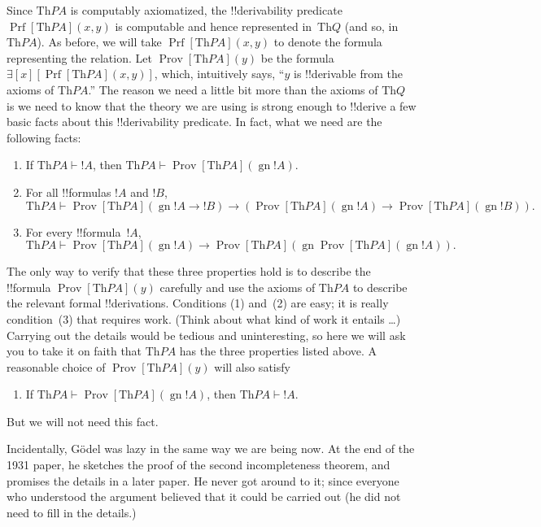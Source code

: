 \documentclass[10pt,a4paper]{article}
\theoremstyle{plain}
\theoremstyle{definition}
\theoremstyle{remark}
\newenvironment{digress}{}{}
\providecommand{\lif}{\mathbin{\rightarrow}}
\providecommand{\lexists}{\mathord{\exists}}
\providecommand{\Proves}{\mathrel{\vdash}}
\providecommand{\Th}{\ensuremath{\mathrm{Th}}}
\providecommand{\Prf}{\operatorname{Prf}}
\providecommand{\gn}{\operatorname{gn}}
\providecommand{\OProv}{\operatorname{Prov}}
\providecommand{\OPrf}{\operatorname{Prf}}
\begin{document}
Since $\Th{PA}$ is computably axiomatized, the !!{derivability}
predicate $\Prf[\Th{PA}](x,y)$ is computable and hence represented
in~$\Th{Q}$ (and so, in~$\Th{PA}$). As before, we will take
$\OPrf[\Th{PA}](x,y)$ to denote the formula representing the relation.
Let $\OProv[\Th{PA}](y)$ be the formula
$\lexists[x][\Prf[\Th{PA}](x,y)]$, which, intuitively says, ``$y$ is
!!{derivable} from the axioms of $\Th{PA}$.''  The reason we need a
little bit more than the axioms of $\Th{Q}$ is we need to know that
the theory we are using is strong enough to !!{derive} a few basic
facts about this !!{derivability} predicate. In fact, what we need are
the following facts:
\begin{enumerate}
\item[P1.] If $\Th{PA} \Proves !A$, then $\Th{PA} \Proves
  \OProv[\Th{PA}](\gn{!A})$.
\item[P2.] For all !!{formula}s $!A$ and $!B$,
  \[
  \Th{PA} \Proves \OProv[\Th{PA}](\gn{!A \lif !B}) \lif
  (\OProv[\Th{PA}](\gn{!A}) \lif \OProv[\Th{PA}](\gn{!B})).
  \]
\item[P3.] For every !!{formula}~$!A$,
  \[
  \Th{PA} \Proves \OProv[\Th{PA}](\gn{!A})
  \lif \OProv[\Th{PA}](\gn{\OProv[\Th{PA}](\gn{!A})}).
  \]
\end{enumerate}
The only way to verify that these three properties hold is to describe
the !!{formula} $\OProv[\Th{PA}](y)$ carefully and use the axioms of
$\Th{PA}$ to describe the relevant formal !!{derivation}s. Conditions (1)
and~(2) are easy; it is really condition~(3) that requires
work. (Think about what kind of work it entails \dots) Carrying out the
details would be tedious and uninteresting, so here we will ask you to
take it on faith that $\Th{PA}$ has the three properties listed
above. A reasonable choice of $\OProv[\Th{PA}](y)$ will also satisfy
\begin{enumerate}
\item[P4.] If $\Th{PA} \Proves \OProv[\Th{PA}](\gn{!A})$, then
  $\Th{PA} \Proves !A$.
\end{enumerate}
But we will not need this fact.

\begin{digress}
Incidentally, G\"odel was lazy in the same way we are
being now. At the end of the 1931 paper, he sketches the proof of the
second incompleteness theorem, and promises the details in a later
paper. He never got around to it; since everyone who understood the
argument believed that it could be carried out (he did not need to
fill in the details.)
\end{digress}
\end{document}
